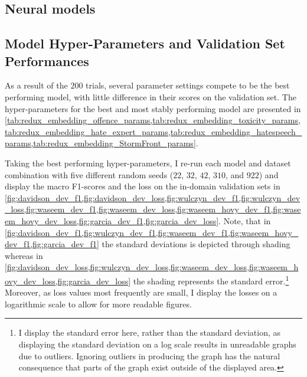 \subsection{Neural models}  
\subsection{Model Hyper-Parameters and Validation Set Performances}  
As a result of the $200$ trials, several parameter settings compete to be the best performing model, with little difference in their scores on the validation set.  
The hyper-parameters for the best and most stably performing model are presented in \cref{tab:redux_embedding_offence_params,tab:redux_embedding_toxicity_params,tab:redux_embedding_hate_expert_params,tab:redux_embedding_hatespeech_params,tab:redux_embedding_StormFront_params}.  
  
Taking the best performing hyper-parameters, I re-run each model and dataset combination with five different random seeds ($22$, $32$, $42$, $310$, and $922$) and display the macro F1-scores and the loss on the in-domain validation sets in \cref{fig:davidson_dev_f1,fig:davidson_dev_loss,fig:wulczyn_dev_f1,fig:wulczyn_dev_loss,fig:waseem_dev_f1,fig:waseem_dev_loss,fig:waseem_hovy_dev_f1,fig:waseem_hovy_dev_loss,fig:garcia_dev_f1,fig:garcia_dev_loss}.  
Note, that in \cref{fig:davidson_dev_f1,fig:wulczyn_dev_f1,fig:waseem_dev_f1,fig:waseem_hovy_dev_f1,fig:garcia_dev_f1} the standard deviations is depicted through shading whereas in \cref{fig:davidson_dev_loss,fig:wulczyn_dev_loss,fig:waseem_dev_loss,fig:waseem_hovy_dev_loss,fig:garcia_dev_loss} the shading represents the standard error.\footnote{I display the standard error here, rather than the standard deviation, as displaying the standard deviation on a log scale results in unreadable graphs due to outliers. Ignoring outliers in producing the graph has the natural consequence that parts of the graph exist outside of the displayed area.}  
Moreover, as loss values most frequently are small, I display the losses on a logarithmic scale to allow for more readable figures.  
  
